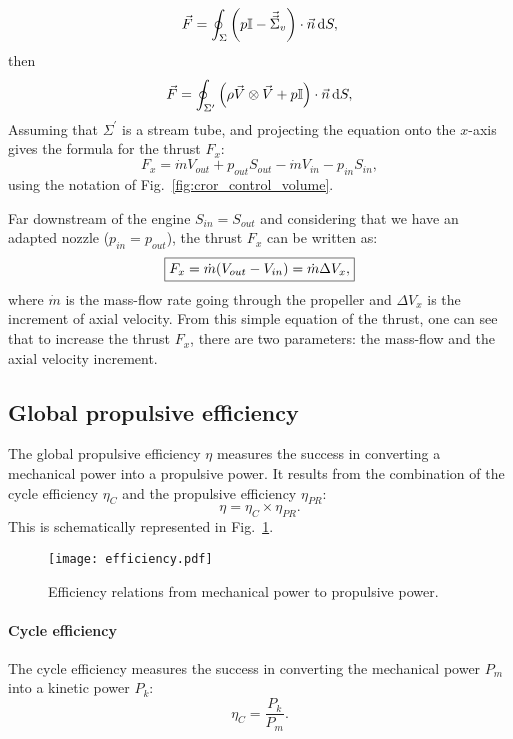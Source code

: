\begin{equation}
	\vec{F} = \oint_{\Sigma} \left(p \mathbb{I} - 
	\vec{\vec{\Sigma}}_v \right) \cdot \vec{n} \mathop{}\!\mathrm{d} S,
\end{equation}
then
\begin{equation}
	\vec{F} = \oint_{\Sigma^\prime} \left(\rho \vec{V} \otimes \vec{V} +
	p \mathbb{I} \right) \cdot \vec{n} \mathop{}\!\mathrm{d} S,
\end{equation}
Assuming that $\Sigma^\prime$ is a stream tube, and projecting the equation
onto the $x$-axis gives the formula for the thrust $F_x$:
\begin{equation}
	F_x = \dot{m} V_{out} + p_{out} S_{out}
	- \dot{m} V_{in} - p_{in} S_{in},
\end{equation}
using the notation of Fig.~\ref{fig:cror_control_volume}.

Far downstream of the engine $S_{in} = S_{out}$ and
considering that we have an adapted nozzle ($p_{in} = p_{out}$),
the thrust $F_x$ can be written as:
\begin{equation}
	\fbox{$
	F_x = \dot{m} (V_{out} - V_{in}) = \dot{m} \Delta V_x,
	$}
	\label{eq:cror_thrust}
\end{equation}
where $\dot{m}$ is the mass-flow rate going through the
propeller and $\Delta V_x$ is
the increment of axial velocity. From this simple equation of the thrust,
one can see that to increase the thrust $F_x$, there are two parameters:
the mass-flow and the axial velocity increment.

\subsection{Global propulsive efficiency}
\label{sub:cror_efficiency}

The global propulsive efficiency $\eta$ measures the 
success in converting a mechanical power into a
propulsive power. It results from the combination
of the cycle efficiency $\eta_{C}$ and the propulsive efficiency
$\eta_{PR}$:
\begin{equation}
	\eta = \eta_{C} \times \eta_{PR}.
\end{equation}
This is schematically represented in Fig.~\ref{fig:cror_efficiency}.
\begin{figure}[htb]
  \centering
  \texttt{[image: efficiency.pdf]}
  \caption{Efficiency relations from mechanical power to propulsive power.}
  \label{fig:cror_efficiency}
\end{figure}


\paragraph{Cycle efficiency}
The cycle efficiency measures the success in converting the mechanical
power $P_m$ into a kinetic power $P_k$:
\begin{equation}
	\eta_C = \frac{P_k}{P_m}.
\end{equation}

